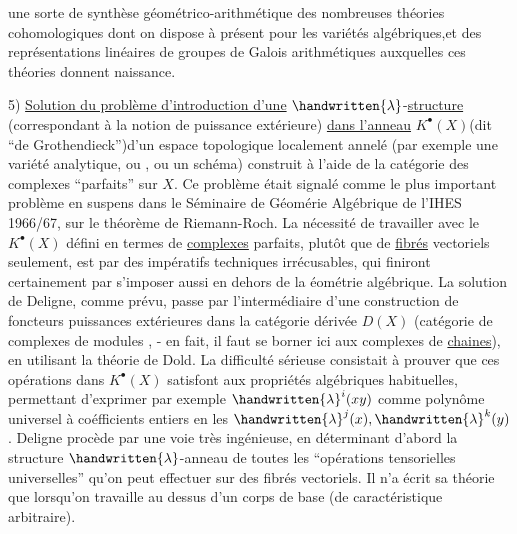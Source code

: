 une sorte de synthèse géométrico-arithmétique des nombreuses théories cohomologiques dont on dispose à présent pour les variétés algébriques,et des représentations linéaires de groupes de Galois arithmétiques auxquelles ces théories donnent naissance.

5) \uline{Solution du problème d'introduction d'une} $\handwritten{\lambda}$-\uline{structure} (correspondant à la notion de puissance extérieure) \uline{dans l'anneau} $K^\bullet(X)$(dit ``de Grothendieck'')d'un espace topologique localement annelé (par exemple une variété analytique, ou , ou un schéma)\handwritten{,} construit à l'aide de la catégorie des complexes ``parfaits'' sur $X$. Ce problème était signalé comme le plus important problème  en suspens dans le Séminaire de Géomérie Algébrique de l'IHES 1966/67, sur le théorème de Riemann-Roch. La nécessité de travailler avec le $K^\bullet(X)$ défini en termes de \uline{complexes} parfaits, plutôt que de \uline{fibrés} vectoriels seulement, est  par des  impératifs techniques irrécusables, qui finiront certainement par s'imposer aussi en dehors de la éométrie algébrique. La solution de Deligne, comme prévu, passe par l'intermédiaire d'une construction de  foncteurs puissances extérieures dans la catégorie dérivée $D(X)$ (catégorie de complexes de modules , - en fait, il faut se borner ici aux complexes de \uline{chaines}), en utilisant la théorie de Dold. La difficulté sérieuse consistait à prouver que ces opérations dans $K^\bullet(X)$ satisfont aux propriétés algébriques habituelles, permettant d'exprimer par exemple $\handwritten{\lambda}^i(xy)$ comme polynôme universel à coéfficients entiers en les $\handwritten{\lambda}^j(x),\handwritten{\lambda}^k(y)$. Deligne procède par une voie très ingénieuse, en déterminant d'abord la structure  $\handwritten{\lambda}$-anneau de toutes les ``opérations tensorielles universelles'' qu'on peut effectuer sur des fibrés vectoriels. Il n'a écrit sa théorie que lorsqu'on travaille au dessus d'un corps de base (de caractéristique arbitraire). 
